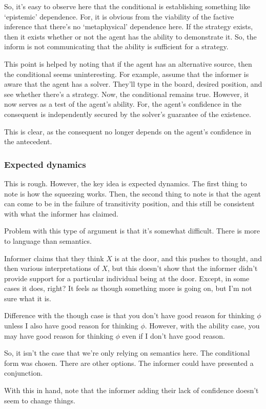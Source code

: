 \documentclass[10pt]{article}
\begin{document}
\begin{note}
  So, it's easy to observe here that the conditional is establishing something like `epistemic' dependence.
  For, it is obvious from the viability of the factive inference that there's no `metaphysical' dependence here.
  If the strategy exists, then it exists whether or not the agent has the ability to demonstrate it.
  So, the inform is not communicating that the ability is sufficient for a strategy.

  This point is helped by noting that if the agent has an alternative source, then the conditional seems uninteresting.
  For example, assume that the informer is aware that the agent has a solver.
  They'll type in the board, desired position, and see whether there's a strategy.
  Now, the conditional remains true.
  However, it now serves as a test of the agent's ability.
  For, the agent's confidence in the consequent is independently secured by the solver's guarantee of the existence.
\end{note}

\begin{note}
  This is clear, as the consequent no longer depends on the agent's confidence in the antecedent.
\end{note}


\subsubsection{Expected dynamics}
\label{sec:expected-dynamics}

\begin{note}
  This is rough.
  However, the key idea is expected dynamics.
  The first thing to note is how the squeezing works.
  Then, the second thing to note is that the agent can come to be in the failure of transitivity position, and this still be consistent with what the informer has claimed.

  Problem with this type of argument is that it's somewhat difficult.
  There is more to language than semantics.

  Informer claims that they think \(X\) is at the door, and this pushes to thought, and then various interpretations of \(X\), but this doesn't show that the informer didn't provide support for a particular individual being at the door.
  Except, in some cases it does, right?
  It feels as though something more is going on, but I'm not sure what it is.

  Difference with the though case is that you don't have good reason for thinking \(\phi\) unless I also have good reason for thinking \(\phi\).
  However, with the ability case, you may have good reason for thinking \(\phi\) even if I don't have good reason.

  So, it isn't the case that we're only relying on semantics here.
  The conditional form was chosen.
  There are other options.
  The informer could have presented a conjunction.

  With this in hand, note that the informer adding their lack of confidence doesn't seem to change things.
\end{note}
\end{document}
